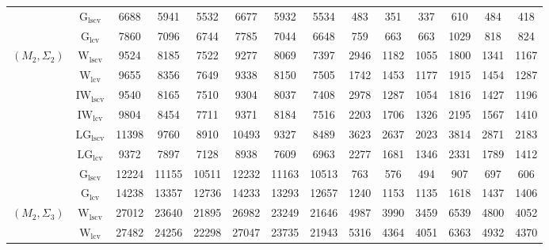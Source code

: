 \begin{table}[!ht]
{\begin{tabular}{@{}cc|ccc|ccc|ccc|ccc@{}}
 & $\mathrm{G}_{\mathrm{lscv}}$ & 6688 & 5941 & 5532 & 6677 & 5932 & 5534 & \cellcolor{black!30}483 & \cellcolor{black!30}351 & \cellcolor{black!30}337 & \cellcolor{black!30}610 & \cellcolor{black!30}484 & \cellcolor{black!30}418 \\ 
 & $\mathrm{G}_{\mathrm{lcv}}$ & 7860 & 7096 & 6744 & 7785 & 7044 & 6648 & \cellcolor{black!10}759 & \cellcolor{black!10}663 & 663 & \cellcolor{black!10}1029 & \cellcolor{black!10}818 & 824 \\ 
\midrule
$(M_2,\Sigma_2)$ & $\mathrm{W}_{\mathrm{lscv}}$ & \cellcolor{black!10}9524 & 8185 & 7522 & \cellcolor{black!10}9277 & 8069 & \cellcolor{black!10}7397 & 2946 & 1182 & 1055 & 1800 & \cellcolor{black!10}1341 & \cellcolor{black!10}1167 \\ 
 & $\mathrm{W}_{\mathrm{lcv}}$ & 9655 & 8356 & 7649 & 9338 & 8150 & 7505 & 1742 & 1453 & 1177 & 1915 & 1454 & 1287 \\ 
 & $\mathrm{IW}_{\mathrm{lscv}}$ & 9540 & \cellcolor{black!10}8165 & \cellcolor{black!10}7510 & 9304 & \cellcolor{black!10}8037 & 7408 & 2978 & 1287 & \cellcolor{black!10}1054 & 1816 & 1427 & 1196 \\ 
 & $\mathrm{IW}_{\mathrm{lcv}}$ & 9804 & 8454 & 7711 & 9371 & 8184 & 7516 & 2203 & 1706 & 1326 & 2195 & 1567 & 1410 \\ 
 & $\mathrm{LG}_{\mathrm{lscv}}$ & 11398 & 9760 & 8910 & 10493 & 9327 & 8489 & 3623 & 2637 & 2023 & 3814 & 2871 & 2183 \\ 
 & $\mathrm{LG}_{\mathrm{lcv}}$ & \cellcolor{black!30}9372 & \cellcolor{black!30}7897 & \cellcolor{black!30}7128 & \cellcolor{black!30}8938 & \cellcolor{black!30}7609 & \cellcolor{black!30}6963 & 2277 & 1681 & 1346 & 2331 & 1789 & 1412 \\ 
 & $\mathrm{G}_{\mathrm{lscv}}$ & 12224 & 11155 & 10511 & 12232 & 11163 & 10513 & \cellcolor{black!30}763 & \cellcolor{black!30}576 & \cellcolor{black!30}494 & \cellcolor{black!30}907 & \cellcolor{black!30}697 & \cellcolor{black!30}606 \\ 
 & $\mathrm{G}_{\mathrm{lcv}}$ & 14238 & 13357 & 12736 & 14233 & 13293 & 12657 & \cellcolor{black!10}1240 & \cellcolor{black!10}1153 & 1135 & \cellcolor{black!10}1618 & 1437 & 1406 \\ 
\midrule
$(M_2,\Sigma_3)$ & $\mathrm{W}_{\mathrm{lscv}}$ & 27012 & 23640 & 21895 & 26982 & 23249 & 21646 & \cellcolor{black!30}4987 & \cellcolor{black!30}3990 & \cellcolor{black!30}3459 & 6539 & \cellcolor{black!10}4800 & \cellcolor{black!10}4052 \\ 
 & $\mathrm{W}_{\mathrm{lcv}}$ & 27482 & 24256 & 22298 & 27047 & 23735 & 21943 & 5316 & 4364 & 4051 & \cellcolor{black!10}6363 & 4932 & 4370 \\ 

\end{tabular}}
\end{table}
